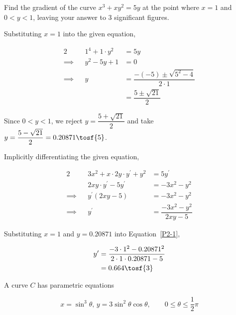 \documentclass{jhwhw}
\begin{document}

    \problem{}
        Find the gradient of the curve $x^3 + xy^2 = 5y$ at the point where $x=1$ and $0 < y < 1$, leaving your answer to 3 significant figures.

    \solution
        Substituting $x=1$ into the given equation,

        \begin{alignat*}{2}
            &&1^4 + 1\cdot y^2 &= 5y\\
            \implies&&y^2-5y+1&=0\\
            \implies&&y &= \dfrac{-(-5)\pm\sqrt{5^2-4}}{2\cdot1}\\
            && &= \dfrac{5\pm\sqrt{21}}2
        \end{alignat*}

        Since $0 < y < 1$, we reject $y = \dfrac{5+\sqrt{21}}2$ and take $y = \dfrac{5-\sqrt{21}}2 = 0.20871 \tosf{5}$.

        Implicitly differentiating the given equation,

        \begin{alignat}{2}
            &&3x^2+x\cdot2y\cdot y^\prime + y^2 &= 5y^\prime \nonumber\\
            &&2xy\cdot y^\prime - 5y^\prime &= -3x^2-y^2 \nonumber\\
            \implies&&y^\prime(2xy-5)&=-3x^2-y^2 \nonumber\\
            \implies&&y^\prime &= \dfrac{-3x^2-y^2}{2xy-5}\label{P2-1}
        \end{alignat}

        Substituting $x=1$ and $y=0.20871$ into Equation~\ref{P2-1}, 

        \begin{align*}
            y^\prime &= \dfrac{-3\cdot1^2-0.20871^2}{2\cdot 1 \cdot 0.20871-5}\\
            &= 0.664 \tosf{3}
        \end{align*}


    \problem{}
        A curve $C$ has parametric equations

        \begin{equation*}
            x = \sin^3 \theta, \, y = 3 \sin^2 \theta \cos \theta, \qquad 0 \leq \theta \leq \dfrac12 \pi
        \end{equation*}
\end{document}
